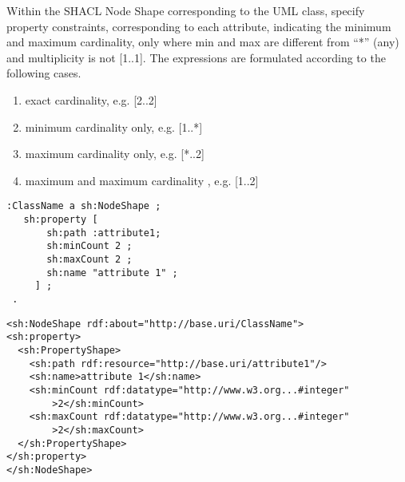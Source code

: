 \begin{trule}
	\label{rule:attribute-ds-multiplicity}
	Within the SHACL Node Shape corresponding to the UML class, specify property constraints, corresponding to each attribute, indicating the minimum and maximum cardinality, only where min and max are different from ``*'' (any) and multiplicity is not [1..1]. The expressions are formulated according to the following cases.	
	\begin{enumerate}[label=\Alph*.]
		\item exact cardinality, e.g. [2..2]
		\item minimum cardinality only, e.g. [1..*]
		\item maximum cardinality only, e.g. [*..2]
		\item maximum and maximum cardinality , e.g. [1..2]
	\end{enumerate}
\end{trule}

\vspace{-\parskip}
\begin{minipage}[b]{.385\textwidth}
\begin{lstlisting}[language=Turtle, caption={Exact cardinality constraint in  Turtle syntax}, captionpos=b]
 :ClassName a sh:NodeShape ;
   sh:property [
       sh:path :attribute1;
       sh:minCount 2 ;
       sh:maxCount 2 ;
       sh:name "attribute 1" ;
     ] ;
 .
\end{lstlisting}
\end{minipage}%
\quad\vspace{-\parskip}
\begin{minipage}[b]{.6\textwidth}
\begin{lstlisting}[language=RDF/XML, caption={Exact cardinality constraint in RDF/XML syntax}, captionpos=b]
<sh:NodeShape rdf:about="http://base.uri/ClassName">
<sh:property>
  <sh:PropertyShape>
    <sh:path rdf:resource="http://base.uri/attribute1"/>
    <sh:name>attribute 1</sh:name>
    <sh:minCount rdf:datatype="http://www.w3.org...#integer"
        >2</sh:minCount>
    <sh:maxCount rdf:datatype="http://www.w3.org...#integer"
        >2</sh:maxCount>        
  </sh:PropertyShape>
</sh:property>
</sh:NodeShape>
\end{lstlisting}
\end{minipage}
\vspace{-\parskip}

